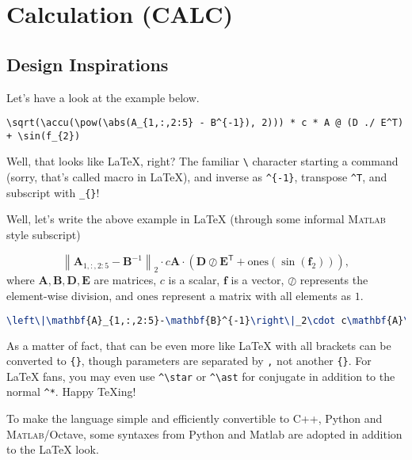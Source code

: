 \section{Calculation (CALC)}\label{d:sec:calc}
\subsection{Design Inspirations}
Let's have a look at the example below.
\begin{lstlisting}[language=mmcesim-sim]
\sqrt(\accu(\pow(\abs(A_{1,:,2:5} - B^{-1}), 2))) * c * A @ (D ./ E^T) + \sin(f_{2})
\end{lstlisting}
Well, that looks like \LaTeX{}, right?
The familiar \texttt{\textbackslash} character starting a command
(sorry, that's called macro in \LaTeX{}),
and inverse as \verb|^{-1}|, transpose \verb|^T|, and subscript with \verb|_{}|!

Well, let's write the above example in LaTeX (through some informal \textsc{Matlab} style subscript)
\begin{example}
  \begin{equation}
    \left\|\mathbf{A}_{1,:,2:5}-\mathbf{B}^{-1}\right\|_2\cdot c\mathbf{A}\cdot\left(\mathbf{D}\oslash\mathbf{E}^\mathsf{T}+\mathrm{ones}(\sin(\mathbf{f}_2))\right),
  \end{equation}
  where $\mathbf{A},\mathbf{B},\mathbf{D},\mathbf{E}$ are matrices,
  $c$ is a scalar, $\mathbf{f}$ is a vector, $\oslash$ represents the element-wise division,
  and $\mathrm{ones}$ represent a matrix with all elements as $1$.
  \begin{lstlisting}[language=tex]
\left\|\mathbf{A}_{1,:,2:5}-\mathbf{B}^{-1}\right\|_2\cdot c\mathbf{A}\cdot\left(\mathbf{D}\oslash\mathbf{E}^\mathsf{T}+\mathrm{ones}(\sin(\mathbf{f}_2))\right)
  \end{lstlisting}
\end{example}
\begin{tip}
  As a matter of fact, that can be even more like \LaTeX{}
  with all brackets can be converted to \verb`{}`, though parameters are separated by \verb`,` not another \verb`{}`.
  For \LaTeX{} fans, you may even use \verb`^\star` or \verb`^\ast` for conjugate in addition to the normal \verb`^*`.
  Happy \TeX ing!

  To make the language simple and efficiently convertible to C++, Python and \textsc{Matlab}/Octave,
  some syntaxes from Python and Matlab are adopted in addition to the \LaTeX{} look.
\end{tip}

